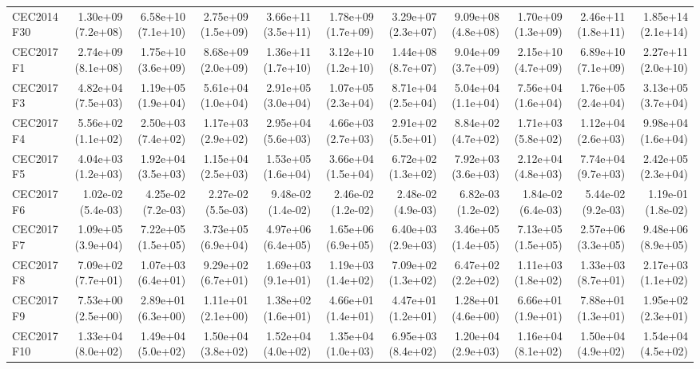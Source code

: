\begin{longtable}{lrrrrrrrrrr}
CEC2014 F30 & 1.30e+09 (7.2e+08) & 6.58e+10 (7.1e+10) & 2.75e+09 (1.5e+09) & 3.66e+11 (3.5e+11) & 1.78e+09 (1.7e+09) & 3.29e+07 (2.3e+07) & 9.09e+08 (4.8e+08) & 1.70e+09 (1.3e+09) & 2.46e+11 (1.8e+11) & 1.85e+14 (2.1e+14) \\
CEC2017 F1 & 2.74e+09 (8.1e+08) & 1.75e+10 (3.6e+09) & 8.68e+09 (2.0e+09) & 1.36e+11 (1.7e+10) & 3.12e+10 (1.2e+10) & 1.44e+08 (8.7e+07) & 9.04e+09 (3.7e+09) & 2.15e+10 (4.7e+09) & 6.89e+10 (7.1e+09) & 2.27e+11 (2.0e+10) \\
CEC2017 F3 & 4.82e+04 (7.5e+03) & 1.19e+05 (1.9e+04) & 5.61e+04 (1.0e+04) & 2.91e+05 (3.0e+04) & 1.07e+05 (2.3e+04) & 8.71e+04 (2.5e+04) & 5.04e+04 (1.1e+04) & 7.56e+04 (1.6e+04) & 1.76e+05 (2.4e+04) & 3.13e+05 (3.7e+04) \\
CEC2017 F4 & 5.56e+02 (1.1e+02) & 2.50e+03 (7.4e+02) & 1.17e+03 (2.9e+02) & 2.95e+04 (5.6e+03) & 4.66e+03 (2.7e+03) & 2.91e+02 (5.5e+01) & 8.84e+02 (4.7e+02) & 1.71e+03 (5.8e+02) & 1.12e+04 (2.6e+03) & 9.98e+04 (1.6e+04) \\
CEC2017 F5 & 4.04e+03 (1.2e+03) & 1.92e+04 (3.5e+03) & 1.15e+04 (2.5e+03) & 1.53e+05 (1.6e+04) & 3.66e+04 (1.5e+04) & 6.72e+02 (1.3e+02) & 7.92e+03 (3.6e+03) & 2.12e+04 (4.8e+03) & 7.74e+04 (9.7e+03) & 2.42e+05 (2.3e+04) \\
CEC2017 F6 & 1.02e-02 (5.4e-03) & 4.25e-02 (7.2e-03) & 2.27e-02 (5.5e-03) & 9.48e-02 (1.4e-02) & 2.46e-02 (1.2e-02) & 2.48e-02 (4.9e-03) & 6.82e-03 (1.2e-02) & 1.84e-02 (6.4e-03) & 5.44e-02 (9.2e-03) & 1.19e-01 (1.8e-02) \\
CEC2017 F7 & 1.09e+05 (3.9e+04) & 7.22e+05 (1.5e+05) & 3.73e+05 (6.9e+04) & 4.97e+06 (6.4e+05) & 1.65e+06 (6.9e+05) & 6.40e+03 (2.9e+03) & 3.46e+05 (1.4e+05) & 7.13e+05 (1.5e+05) & 2.57e+06 (3.3e+05) & 9.48e+06 (8.9e+05) \\
CEC2017 F8 & 7.09e+02 (7.7e+01) & 1.07e+03 (6.4e+01) & 9.29e+02 (6.7e+01) & 1.69e+03 (9.1e+01) & 1.19e+03 (1.4e+02) & 7.09e+02 (1.3e+02) & 6.47e+02 (2.2e+02) & 1.11e+03 (1.8e+02) & 1.33e+03 (8.7e+01) & 2.17e+03 (1.1e+02) \\
CEC2017 F9 & 7.53e+00 (2.5e+00) & 2.89e+01 (6.3e+00) & 1.11e+01 (2.1e+00) & 1.38e+02 (1.6e+01) & 4.66e+01 (1.4e+01) & 4.47e+01 (1.2e+01) & 1.28e+01 (4.6e+00) & 6.66e+01 (1.9e+01) & 7.88e+01 (1.3e+01) & 1.95e+02 (2.3e+01) \\
CEC2017 F10 & 1.33e+04 (8.0e+02) & 1.49e+04 (5.0e+02) & 1.50e+04 (3.8e+02) & 1.52e+04 (4.0e+02) & 1.35e+04 (1.0e+03) & 6.95e+03 (8.4e+02) & 1.20e+04 (2.9e+03) & 1.16e+04 (8.1e+02) & 1.50e+04 (4.9e+02) & 1.54e+04 (4.5e+02) \\

\end{longtable}
